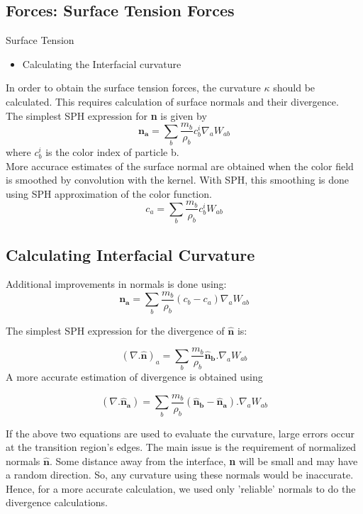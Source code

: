 \documentclass{beamer}
\begin{document}
\subsection{Forces: Surface Tension Forces}
\begin{frame}{Surface Tension}
\begin{itemize}
 \item Calculating the Interfacial curvature
\end{itemize}

In order to obtain the surface tension forces, the curvature $\kappa$ should be calculated. 
This requires calculation of surface normals and their divergence.\\

The simplest SPH expression for \textbf{n} is given by
\begin{equation*}
 \mathbf{n_a} = \sum_b \frac{m_b}{\rho_b} c_b^i \nabla_a W_{ab}
\end{equation*}
\noindent
where $c_b^i$ is the color index of particle b. \\
More accurace estimates of the surface normal are obtained when the color field is smoothed by convolution with the kernel. With SPH, this smoothing is done using SPH approximation of the color function.
\begin{equation*}
 c_a = \sum_b \frac{m_b}{\rho_b}c_b^i W_{ab}
\end{equation*}
\end{frame}

\subsection{Calculating Interfacial Curvature}
\begin{frame}
Additional improvements in normals is done using:
\begin{equation*}
 \mathbf{n_a} = \sum_b \frac{m_b}{\rho_b} (c_b - c_a)\nabla_a W_{ab}
  \label{normal}
 \end{equation*}

The simplest SPH expression for the divergence of $\mathbf{\hat n}$ is:

\begin{equation*}
 \left( \nabla . \mathbf{\hat n}\right)_a = \sum_b \frac{m_b}{\rho_b} \mathbf{\hat n_b}.\nabla_a W_{ab}
\end{equation*}
\noindent
A more accurate estimation of divergence is obtained using

\begin{equation*}
 \left( \nabla . \mathbf{\hat n_a}\right) = \sum_b \frac{m_b}{\rho_b}(\mathbf{\hat n_b} - \mathbf{\hat n_a}). \nabla_a W_{ab} 
  \label{divergence}
 \end{equation*}


If the above two equations are used to evaluate the curvature, large errors occur at the transition region's edges. 
The main issue is the requirement of normalized normals $\mathbf{\hat n}$. 
Some distance away from the interface, \textbf{n} will be small and may have a random direction. 
So, any curvature using these normals would be inaccurate. 
Hence, for a more accurate calculation, we used only 'reliable' normals to do the divergence calculations. 
\end{frame}
\end{document}

